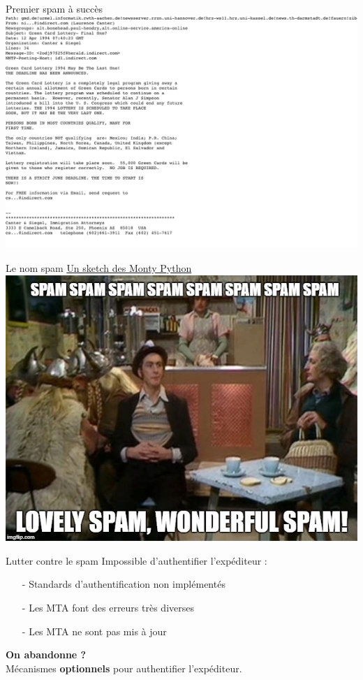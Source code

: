 \documentclass{beamer}
\begin{document}
\begin{frame}{Premier spam à succès}
    \includegraphics[width=.8\textwidth]{Images/spam.png}
\end{frame}

\begin{frame}{Le nom spam}
    \href{https://youtu.be/ycKNt0MhTkk?feature=shared&t=147}{Un sketch des Monty Python} \\

    \includegraphics[width=.6\textwidth]{Images/monty-python-spam.jpg}
\end{frame}

\begin{frame}{Lutter contre le spam}
    Impossible d'authentifier l'expéditeur :
    \pause
    \begin{itemize}
        \item[-] Standards d'authentification non implémentés
        \item[-] Les MTA font des erreurs très diverses
        \item[-] Les MTA ne sont pas mis à jour
    \end{itemize}
    \pause

    \vspace{20pt}
    \Rightarrow \hspace{5pt} \textbf{On abandonne ?}
    \pause
    \\
    \Rightarrow \hspace{5pt} \Rightarrow \hspace{5pt} Mécanismes \textbf{optionnels} pour authentifier l'expéditeur.
\end{frame}
\end{document}
